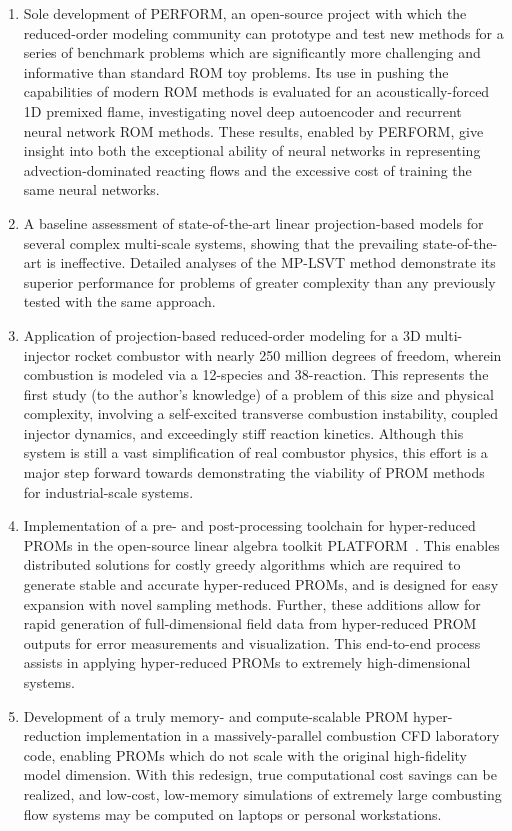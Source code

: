\begin{enumerate}
    \item Sole development of PERFORM, an open-source project with which the reduced-order modeling community can prototype and test new methods for a series of benchmark problems which are significantly more challenging and informative than standard ROM toy problems. Its use in pushing the capabilities of modern ROM methods is evaluated for an acoustically-forced 1D premixed flame, investigating novel deep autoencoder and recurrent neural network ROM methods. These results, enabled by PERFORM, give insight into both the exceptional ability of neural networks in representing advection-dominated reacting flows and the excessive cost of training the same neural networks.
    \item A baseline assessment of state-of-the-art linear projection-based models for several complex multi-scale systems, showing that the prevailing state-of-the-art is ineffective. Detailed analyses of the MP-LSVT method demonstrate its superior performance for problems of greater complexity than any previously tested with the same approach.
    \item Application of projection-based reduced-order modeling for a 3D multi-injector rocket combustor with nearly 250 million degrees of freedom, wherein combustion is modeled via a 12-species and 38-reaction. This represents the first study (to the author's knowledge) of a problem of this size and physical complexity, involving a self-excited transverse combustion instability, coupled injector dynamics, and exceedingly stiff reaction kinetics. Although this system is still a vast simplification of real combustor physics, this effort is a major step forward towards demonstrating the viability of PROM methods for industrial-scale systems.
    \item Implementation of a pre- and post-processing toolchain for hyper-reduced PROMs in the open-source linear algebra toolkit PLATFORM~\cite{PLATFORM}. This enables distributed solutions for costly greedy algorithms which are required to generate stable and accurate hyper-reduced PROMs, and is designed for easy expansion with novel sampling methods. Further, these additions allow for rapid generation of full-dimensional field data from hyper-reduced PROM outputs for error measurements and visualization. This end-to-end process assists in applying hyper-reduced PROMs to extremely high-dimensional systems.
    \item Development of a truly memory- and compute-scalable PROM hyper-reduction implementation in a massively-parallel combustion CFD laboratory code, enabling PROMs which do not scale with the original high-fidelity model dimension. With this redesign, true computational cost savings can be realized, and low-cost, low-memory simulations of extremely large combusting flow systems may be computed on laptops or personal workstations.

\end{enumerate}
